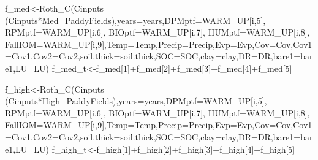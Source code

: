 \documentclass[
  10pt,
  b5paper,
]{book}
\newenvironment{Shaded}{\begin{snugshade}}{\end{snugshade}}
\newcommand{\AttributeTok}[1]{\textcolor[rgb]{0.77,0.63,0.00}{#1}}
\newcommand{\DecValTok}[1]{\textcolor[rgb]{0.00,0.00,0.81}{#1}}
\newcommand{\FunctionTok}[1]{\textcolor[rgb]{0.00,0.00,0.00}{#1}}
\newcommand{\NormalTok}[1]{#1}
\newcommand{\OtherTok}[1]{\textcolor[rgb]{0.56,0.35,0.01}{#1}}
\newcommand{\SpecialCharTok}[1]{\textcolor[rgb]{0.00,0.00,0.00}{#1}}
\begin{document}
\begin{Shaded}
\begin{Highlighting}[]
\NormalTok{f\_med}\OtherTok{\textless{}{-}}\FunctionTok{Roth\_C}\NormalTok{(}\AttributeTok{Cinputs=}\NormalTok{(Cinputs}\SpecialCharTok{*}\NormalTok{Med\_PaddyFields),}\AttributeTok{years=}\NormalTok{years,}\AttributeTok{DPMptf=}\NormalTok{WARM\_UP[i,}\DecValTok{5}\NormalTok{], }\AttributeTok{RPMptf=}\NormalTok{WARM\_UP[i,}\DecValTok{6}\NormalTok{], }\AttributeTok{BIOptf=}\NormalTok{WARM\_UP[i,}\DecValTok{7}\NormalTok{], }\AttributeTok{HUMptf=}\NormalTok{WARM\_UP[i,}\DecValTok{8}\NormalTok{], }\AttributeTok{FallIOM=}\NormalTok{WARM\_UP[i,}\DecValTok{9}\NormalTok{],}\AttributeTok{Temp=}\NormalTok{Temp,}\AttributeTok{Precip=}\NormalTok{Precip,}\AttributeTok{Evp=}\NormalTok{Evp,}\AttributeTok{Cov=}\NormalTok{Cov,}\AttributeTok{Cov1=}\NormalTok{Cov1,}\AttributeTok{Cov2=}\NormalTok{Cov2,}\AttributeTok{soil.thick=}\NormalTok{soil.thick,}\AttributeTok{SOC=}\NormalTok{SOC,}\AttributeTok{clay=}\NormalTok{clay,}\AttributeTok{DR=}\NormalTok{DR,}\AttributeTok{bare1=}\NormalTok{bare1,}\AttributeTok{LU=}\NormalTok{LU)}
\NormalTok{f\_med\_t}\OtherTok{\textless{}{-}}\NormalTok{f\_med[}\DecValTok{1}\NormalTok{]}\SpecialCharTok{+}\NormalTok{f\_med[}\DecValTok{2}\NormalTok{]}\SpecialCharTok{+}\NormalTok{f\_med[}\DecValTok{3}\NormalTok{]}\SpecialCharTok{+}\NormalTok{f\_med[}\DecValTok{4}\NormalTok{]}\SpecialCharTok{+}\NormalTok{f\_med[}\DecValTok{5}\NormalTok{]}

\NormalTok{f\_high}\OtherTok{\textless{}{-}}\FunctionTok{Roth\_C}\NormalTok{(}\AttributeTok{Cinputs=}\NormalTok{(Cinputs}\SpecialCharTok{*}\NormalTok{High\_PaddyFields),}\AttributeTok{years=}\NormalTok{years,}\AttributeTok{DPMptf=}\NormalTok{WARM\_UP[i,}\DecValTok{5}\NormalTok{], }\AttributeTok{RPMptf=}\NormalTok{WARM\_UP[i,}\DecValTok{6}\NormalTok{], }\AttributeTok{BIOptf=}\NormalTok{WARM\_UP[i,}\DecValTok{7}\NormalTok{], }\AttributeTok{HUMptf=}\NormalTok{WARM\_UP[i,}\DecValTok{8}\NormalTok{], }\AttributeTok{FallIOM=}\NormalTok{WARM\_UP[i,}\DecValTok{9}\NormalTok{],}\AttributeTok{Temp=}\NormalTok{Temp,}\AttributeTok{Precip=}\NormalTok{Precip,}\AttributeTok{Evp=}\NormalTok{Evp,}\AttributeTok{Cov=}\NormalTok{Cov,}\AttributeTok{Cov1=}\NormalTok{Cov1,}\AttributeTok{Cov2=}\NormalTok{Cov2,}\AttributeTok{soil.thick=}\NormalTok{soil.thick,}\AttributeTok{SOC=}\NormalTok{SOC,}\AttributeTok{clay=}\NormalTok{clay,}\AttributeTok{DR=}\NormalTok{DR,}\AttributeTok{bare1=}\NormalTok{bare1,}\AttributeTok{LU=}\NormalTok{LU)}
\NormalTok{f\_high\_t}\OtherTok{\textless{}{-}}\NormalTok{f\_high[}\DecValTok{1}\NormalTok{]}\SpecialCharTok{+}\NormalTok{f\_high[}\DecValTok{2}\NormalTok{]}\SpecialCharTok{+}\NormalTok{f\_high[}\DecValTok{3}\NormalTok{]}\SpecialCharTok{+}\NormalTok{f\_high[}\DecValTok{4}\NormalTok{]}\SpecialCharTok{+}\NormalTok{f\_high[}\DecValTok{5}\NormalTok{]}


\end{Highlighting}
\end{Shaded}
\end{document}
